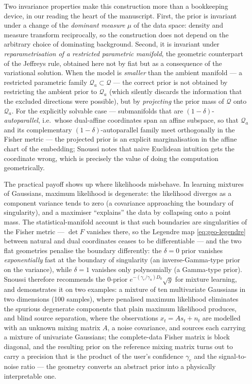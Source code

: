 Two invariance properties make this construction more than a bookkeeping
device, in our reading the heart of the manuscript. First, the prior is
invariant under a change of the \emph{dominant measure} $\mu$ of the data
space: density and measure transform reciprocally, so the construction does
not depend on the arbitrary choice of dominating background. Second, it is
invariant under \emph{reparametrisation of a restricted parametric manifold},
the geometric counterpart of the Jeffreys rule, obtained here not by fiat but
as a consequence of the variational solution. When the model is \emph{smaller}
than the ambient manifold --- a restricted parametric family
$\mathcal{Q}_a \subset \mathcal{Q}$ --- the correct prior is not obtained by
restricting the ambient prior to $\mathcal{Q}_a$ (which silently discards the
information that the excluded directions were possible), but by
\emph{projecting} the prior mass of $\mathcal{Q}$ onto $\mathcal{Q}_a$. For
the explicitly solvable case --- submanifolds that are
$(1-\delta)$-\emph{autoparallel}, i.e.\ whose dual-affine coordinates span an
affine subspace, so that $\mathcal{Q}_a$ and its complementary
$(1-\delta)$-autoparallel family meet orthogonally in the Fisher metric ---
the projected prior is an explicit marginalisation in the affine chart of the
embedding; Snoussi notes that naive Euclidean intuition gets the coordinate
wrong, which is precisely the value of doing the computation geometrically.

The practical payoff shows up where likelihoods misbehave. In learning
mixtures of Gaussians, maximum likelihood is degenerate: the likelihood
diverges as a component variance tends to zero (a covariance approaching the
boundary of singularity), and a maximiser ``explains'' the data by collapsing
onto a point mass. The statistical-manifold account is that such boundaries
are singularities of the Fisher metric --- $\det F$ vanishes there, so the
Legendre map \eqref{eq:geo-legendre} between natural and dual coordinates
ceases to be differentiable --- and the two flat geometries penalise the
boundary differently: the $\delta = 0$ prior vanishes \emph{exponentially}
fast at the boundary of singularity (an inverse-Gamma-type prior on the
variance), while $\delta = 1$ vanishes only polynomially (a Gamma-type
prior). Snoussi therefore recommends the $0$-prior
$e^{-(\gamma_e/\gamma_u)D_0}\sqrt{g}$ for mixture learning, and demonstrates
it on two examples: a mixture of ten multivariate Gaussians in two dimensions
(100 samples), where penalised maximum likelihood eliminates the spurious
degenerate components that plain maximum likelihood produces, and blind
source separation, where the observations $x_t = A s_t + n_t$ are modelled
with an unknown mixing matrix $A$, a noise covariance, and sources each
carrying a mixture of univariate Gaussians; the complete-data Fisher matrix
is block diagonal, and the resulting prior on the reference mixing matrix
turns out to carry a precision that is the product of the user's confidence
$\gamma_e$ and the signal-to-noise ratio --- the geometry converts an
abstract prior into a physically interpretable one.

